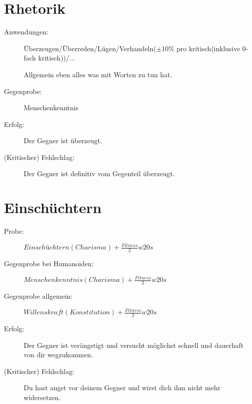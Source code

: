 \section{Rhetorik}
\begin{description}
\item[Anwendungen:] Überzeugen/Überreden/Lügen/Verhandeln($\pm 10\%$ pro kritisch(inklusive 0-fach kritisch))/...

Allgemein eben alles was mit Worten zu tun hat.

\item[Gegenprobe:] Menschenkenntnis

\item[Erfolg:] Der Gegner ist überzeugt.

\item[(Kritischer) Fehlschlag:] Der Gegner ist definitiv vom Gegenteil überzeugt.
\end{description}

\section{Einschüchtern}
\begin{description}
\item[Probe:] $Einschüchtern(Charisma) + \frac{Fitness}{2} w20s$

\item[Gegenprobe bei Humanoiden:] $Menschenkenntnis(Charisma) + \frac{Fitness}{2} w20s$

\item[Gegenprobe allgemein:] $Willenskraft(Konstitution) + \frac{Fitness}{2} w20s$

\item[Erfolg:] Der Gegner ist verängstigt und versucht möglichst schnell und dauerhaft von dir wegzukommen.

\item[(Kritischer) Fehlschlag:] Du hast angst vor deinem Gegner und wirst dich ihm nicht mehr widersetzen.
\end{description}

